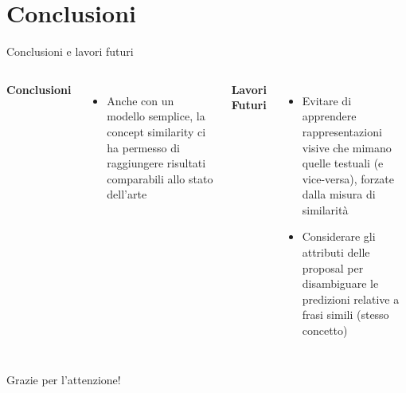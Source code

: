 \documentclass{beamer}
\begin{document}
\section{Conclusioni}

\begin{frame}{Conclusioni e lavori futuri}
  \begin{columns}
      \textbf{Conclusioni}
      \begin{itemize}
        \item Anche con un \alert{modello semplice}, la concept
        similarity ci ha permesso di raggiungere \alert{risultati
        comparabili} allo stato dell'arte
      \end{itemize}
      \textbf{Lavori Futuri}
      \begin{itemize}
        \item \alert{Evitare} di apprendere \alert{rappresentazioni
        visive che mimano quelle testuali} (e vice-versa), forzate
        dalla misura di similarità
        \item Considerare gli \alert{attributi} delle proposal per
        \alert{disambiguare le predizioni} relative a frasi simili
        (stesso concetto)
      \end{itemize}
  \end{columns}
\end{frame}

\begin{frame}
  \centering
  \huge
  Grazie per l'attenzione!
\end{frame}
\end{document}
